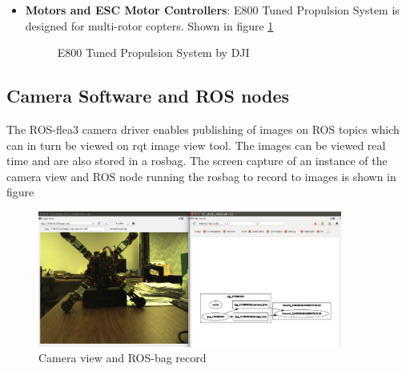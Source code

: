 \documentclass[12pt]{report}
\begin{document}
\begin{itemize}
\item \textbf{Motors and ESC Motor Controllers}: E800 Tuned Propulsion System is designed for multi-rotor copters. Shown in figure \ref{fig:dji_propulsion_system}

\begin{figure}[H]
\centering
	\caption{E800 Tuned Propulsion System by DJI}
   \label{fig:dji_propulsion_system}
\end{figure}

\end{itemize}

\subsection{Camera Software and ROS nodes}
The ROS-flea3 camera driver enables publishing of images on ROS topics which can in turn be viewed on rqt image view tool. The images can be viewed real time and are also stored in a rosbag. The screen capture of an instance of the camera view and ROS node running the rosbag to record to images is shown in figure

\begin{figure}[htp]
	\centering 
    \includegraphics[width=10cm]{cam_rqt.png}
	\caption{Camera view and ROS-bag record}
   \label{fig:cam_rqt}
\end{figure}
\end{document}
